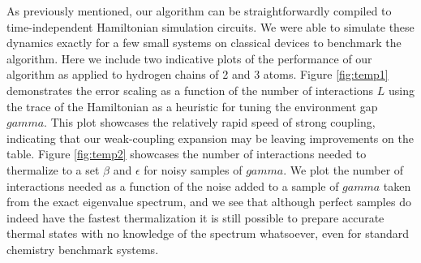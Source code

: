 \documentclass[11pt]{article}
\begin{document}
As previously mentioned, our algorithm can be straightforwardly compiled to time-independent Hamiltonian simulation circuits. We were able to simulate these dynamics exactly for a few small systems on classical devices to benchmark the algorithm. Here we include two indicative plots of the performance of our algorithm as applied to hydrogen chains of 2 and 3 atoms. Figure \ref{fig:temp1} demonstrates the error scaling as a function of the number of interactions $L$ using the trace of the Hamiltonian as a heuristic for tuning the environment gap $gamma$. This plot showcases the relatively rapid speed of strong coupling, indicating that our weak-coupling expansion may be leaving improvements on the table. Figure \ref{fig:temp2} showcases the number of interactions needed to thermalize to a set $\beta$ and $\epsilon$ for noisy samples of $gamma$. We plot the number of interactions needed as a function of the noise added to a sample of $gamma$ taken from the exact eigenvalue spectrum, and we see that although perfect samples do indeed have the fastest thermalization it is still possible to prepare accurate thermal states with no knowledge of the spectrum whatsoever, even for standard chemistry benchmark systems.
\end{document}
